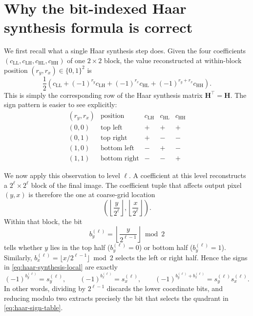 \documentclass[10pt]{article} %
\newcommand{\mH}{\mathbf{H}}
\theoremstyle{plain}
\begin{document}
\clearpage
\section{Why the bit-indexed Haar synthesis formula is correct}
\label{app:bitindexed-proof}

We first recall what a single Haar synthesis step does.  Given the four
coefficients $(c_{\mathrm{LL}},c_{\mathrm{LH}},c_{\mathrm{HL}},
c_{\mathrm{HH}})$ of one $2\times2$ block, the value reconstructed at
within-block position $(r_y,r_x)\in\{0,1\}^2$ is
\begin{equation}
\frac{1}{2}\left(
  c_{\mathrm{LL}}
  + (-1)^{r_y}c_{\mathrm{LH}}
  + (-1)^{r_x}c_{\mathrm{HL}}
  + (-1)^{r_y+r_x}c_{\mathrm{HH}}
\right).
\label{eq:haar-synthesis-local}
\end{equation}
This is simply the corresponding row of the Haar synthesis matrix
$\mH^{\!\top}=\mH$.  The sign pattern is easier to see explicitly:
\begin{equation}
\begin{array}{c|c|ccc}
(r_y,r_x) & \text{position} & c_{\mathrm{LH}} & c_{\mathrm{HL}}
                                      & c_{\mathrm{HH}} \\
\hline
(0,0) & \text{top left}     & + & + & + \\
(0,1) & \text{top right}    & + & - & - \\
(1,0) & \text{bottom left}  & - & + & - \\
(1,1) & \text{bottom right} & - & - & +
\end{array}
\label{eq:haar-sign-table}
\end{equation}

We now apply this observation to level $\ell$.  A coefficient at this level
reconstructs a $2^\ell\times2^\ell$ block of the final image.  The coefficient
tuple that affects output pixel $(y,x)$ is therefore the one at coarse-grid
location
\begin{equation}
\left(\left\lfloor\frac{y}{2^\ell}\right\rfloor,
      \left\lfloor\frac{x}{2^\ell}\right\rfloor\right).
\label{eq:level-coefficient-address}
\end{equation}
Within that block, the bit
\begin{equation}
b_y^{(\ell)}
= \left\lfloor\frac{y}{2^{\ell-1}}\right\rfloor\bmod2
\end{equation}
tells whether $y$ lies in the top half ($b_y^{(\ell)}=0$) or bottom half
($b_y^{(\ell)}=1$).  Similarly,
$b_x^{(\ell)}=\lfloor x/2^{\ell-1}\rfloor\bmod2$ selects the left or right
half.  Hence the signs in \autoref{eq:haar-synthesis-local} are exactly
\begin{equation}
(-1)^{b_y^{(\ell)}}=s_y^{(\ell)}, \qquad
(-1)^{b_x^{(\ell)}}=s_x^{(\ell)}, \qquad
(-1)^{b_y^{(\ell)}+b_x^{(\ell)}}
=s_y^{(\ell)}s_x^{(\ell)}.
\label{eq:level-signs}
\end{equation}
In other words, dividing by $2^{\ell-1}$ discards the lower coordinate bits,
and reducing modulo two extracts precisely the bit that selects the quadrant
in \autoref{eq:haar-sign-table}.
\end{document}
